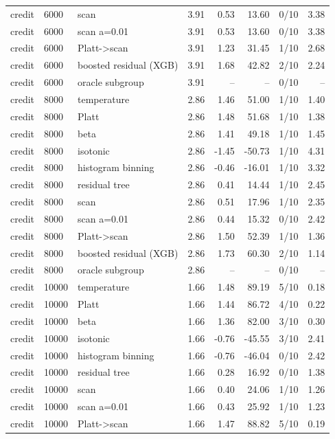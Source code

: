 \begin{tabular}{lllrrrlr}
credit & 6000 & scan & 3.91 & 0.53 & 13.60 & 0/10 & 3.38 \\
credit & 6000 & scan a=0.01 & 3.91 & 0.53 & 13.60 & 0/10 & 3.38 \\
credit & 6000 & Platt->scan & 3.91 & 1.23 & 31.45 & 1/10 & 2.68 \\
credit & 6000 & boosted residual (XGB) & 3.91 & 1.68 & 42.82 & 2/10 & 2.24 \\
credit & 6000 & oracle subgroup & 3.91 & -- & -- & 0/10 & -- \\
credit & 8000 & temperature & 2.86 & 1.46 & 51.00 & 1/10 & 1.40 \\
credit & 8000 & Platt & 2.86 & 1.48 & 51.68 & 1/10 & 1.38 \\
credit & 8000 & beta & 2.86 & 1.41 & 49.18 & 1/10 & 1.45 \\
credit & 8000 & isotonic & 2.86 & -1.45 & -50.73 & 1/10 & 4.31 \\
credit & 8000 & histogram binning & 2.86 & -0.46 & -16.01 & 1/10 & 3.32 \\
credit & 8000 & residual tree & 2.86 & 0.41 & 14.44 & 1/10 & 2.45 \\
credit & 8000 & scan & 2.86 & 0.51 & 17.96 & 1/10 & 2.35 \\
credit & 8000 & scan a=0.01 & 2.86 & 0.44 & 15.32 & 0/10 & 2.42 \\
credit & 8000 & Platt->scan & 2.86 & 1.50 & 52.39 & 1/10 & 1.36 \\
credit & 8000 & boosted residual (XGB) & 2.86 & 1.73 & 60.30 & 2/10 & 1.14 \\
credit & 8000 & oracle subgroup & 2.86 & -- & -- & 0/10 & -- \\
credit & 10000 & temperature & 1.66 & 1.48 & 89.19 & 5/10 & 0.18 \\
credit & 10000 & Platt & 1.66 & 1.44 & 86.72 & 4/10 & 0.22 \\
credit & 10000 & beta & 1.66 & 1.36 & 82.00 & 3/10 & 0.30 \\
credit & 10000 & isotonic & 1.66 & -0.76 & -45.55 & 3/10 & 2.41 \\
credit & 10000 & histogram binning & 1.66 & -0.76 & -46.04 & 0/10 & 2.42 \\
credit & 10000 & residual tree & 1.66 & 0.28 & 16.92 & 0/10 & 1.38 \\
credit & 10000 & scan & 1.66 & 0.40 & 24.06 & 1/10 & 1.26 \\
credit & 10000 & scan a=0.01 & 1.66 & 0.43 & 25.92 & 1/10 & 1.23 \\
credit & 10000 & Platt->scan & 1.66 & 1.47 & 88.82 & 5/10 & 0.19 \\

\end{tabular}
